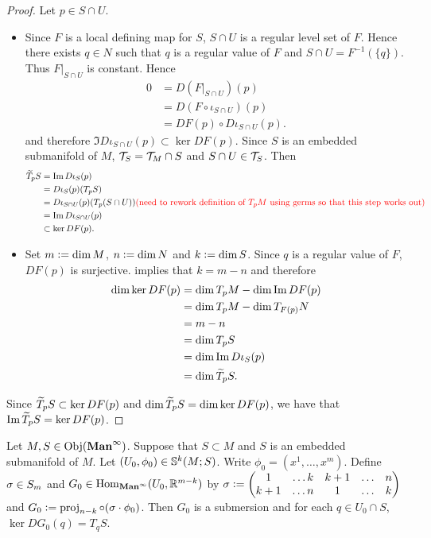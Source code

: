 \documentclass{book}
\begin{document}
	\begin{proof}
		Let $p \in S \cap U$.
		\begin{itemize}
			\item Since $F$ is a local defining map for $S$, $S \cap U$ is a regular level set of $F$. Hence there exists $q \in N$ such that $q$ is a regular value of $F$ and $S \cap U = F^{-1}(\{q\})$. Thus $F|_{S \cap U}$ is constant. Hence
			\begin{align*}
				0
				& = D(F|_{S \cap U})(p) \\
				& = D(F \circ \iota_{S \cap U})(p) \\
				& = DF(p) \circ D \iota_{S \cap U}(p).
			\end{align*} 
			and therefore $\Im D \iota_{S \cap U}(p) \subset \ker DF(p)$. Since $S$ is an embedded submanifold of $M$, $\MT_S = \MT_M \cap S$ and $S \cap U \in \MT_S$. Then
			\begin{align*}
				\wt{T}_pS 
				& = \Im D\iota_S(p) \\
				& = D\iota_S(p)(T_p S) \\
				& = D\iota_{S \cap U}(p)(T_p (S \cap U)) \tcr{\text{(need to rework definition of $T_pM$ using germs so that this step works out)}} \\
				& = \Im D\iota_{S \cap U} (p) \\
				& \subset \ker DF(p).
			\end{align*}
			\item Set $m \defeq \dim M$, $n \defeq \dim N$ and $k \defeq \dim S$. Since $q$ is a regular value of $F$, $DF(p)$ is surjective.  implies that $k = m-n$ and therefore
			\begin{align*}
				\dim \ker DF(p)
				& = \dim T_pM - \dim \Im DF(p) \\
				& = \dim T_pM - \dim T_{F(p)}N \\
				& = m - n \\
				& = \dim T_p S \\
				& = \dim \Im D \iota_S(p) \\
				& = \dim \wt{T}_p S.
			\end{align*}
		\end{itemize}
		Since $\wt{T}_p S \subset \ker DF(p)$ and $\dim \wt{T}_p S = \dim \ker DF(p)$, we have that $\Im \wt{T}_p S = \ker D F(p)$. 
	\end{proof}


	\begin{ex} 
		Let $M, S \in \Obj(\Maninf)$. Suppose that $S \subset M$ and $S$ is an embedded submanifold of $M$. Let $(U_0, \phi_0) \in \S^k(M;S)$. Write $\phi_0 = (x^1, \ldots, x^m)$. Define $\sig \in S_m$ and $G_0 \in \Hom_{\Maninf}(U_0, \R^{m-k})$ by $\sig \defeq 
		\begin{pmatrix}
			1   & \ldots k & k+1 &  \ldots &  n \\
			k+1 & \ldots n & 1   &  \ldots &  k
		\end{pmatrix}$ 
		and $G_0 \defeq  \prj_{n-k} \circ (\sig \cdot \phi_0)$.  Then $G_0$ is a submersion and for each $q \in U_0 \cap S$, $\ker DG_0(q) = T_qS$.
	\end{ex}
\end{document}
